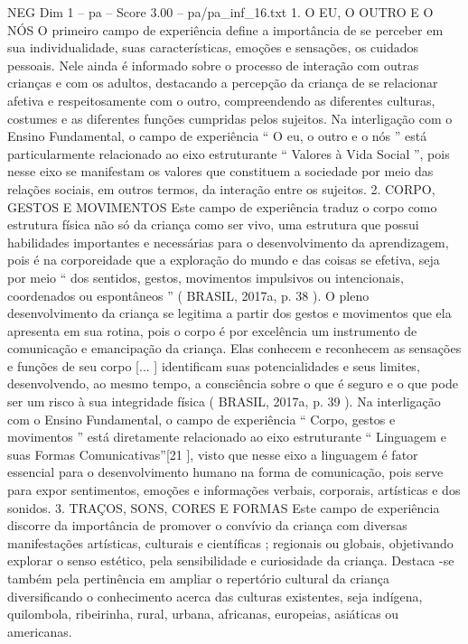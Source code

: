 \begin{textsample}{NEG Dim 1 – pa – Score 3.00 – pa/pa\_inf\_16.txt}  \label{ex:f1_neg_251}
1.
O EU, O OUTRO E O NÓS O primeiro campo de experiência define a importância de se perceber em sua individualidade, suas características, emoções e sensações, os cuidados pessoais.
Nele ainda é informado sobre o processo de interação com outras crianças e com os adultos, destacando a percepção da criança de se relacionar afetiva e respeitosamente com o outro, compreendendo as diferentes culturas, costumes e as diferentes funções cumpridas pelos sujeitos.
Na interligação com o Ensino Fundamental, o campo de experiência “ O eu, o outro e o nós ” está particularmente relacionado ao eixo estruturante “ Valores à Vida Social ”, pois nesse eixo se manifestam os valores que constituem a sociedade por meio das relações sociais, em outros termos, da interação entre os sujeitos. 2.
CORPO, GESTOS E MOVIMENTOS Este campo de experiência traduz o corpo como estrutura física não só da criança como ser vivo, uma estrutura que possui habilidades importantes e necessárias para o desenvolvimento da aprendizagem, pois é na corporeidade que a exploração do mundo e das coisas se efetiva, seja por meio “ dos sentidos, gestos, movimentos impulsivos ou intencionais, coordenados ou espontâneos ” ( BRASIL, 2017a, p. 38 ).
O pleno desenvolvimento da criança se legitima a partir dos gestos e movimentos que ela apresenta em sua rotina, pois o corpo é por excelência um instrumento de comunicação e emancipação da criança.
Elas conhecem e reconhecem as sensações e funções de seu corpo [... ] identificam suas potencialidades e seus limites, desenvolvendo, ao mesmo tempo, a consciência sobre o que é seguro e o que pode ser um risco à sua integridade física ( BRASIL, 2017a, p. 39 ).
Na interligação com o Ensino Fundamental, o campo de experiência “ Corpo, gestos e movimentos ” está diretamente relacionado ao eixo estruturante “ Linguagem e suas Formas Comunicativas”[21 ], visto que nesse eixo a linguagem é fator essencial para o desenvolvimento humano na forma de comunicação, pois serve para expor sentimentos, emoções e informações verbais, corporais, artísticas e dos sonidos. 3.
TRAÇOS, SONS, CORES E FORMAS Este campo de experiência discorre da importância de promover o convívio da criança com diversas manifestações artísticas, culturais e científicas ; regionais ou globais, objetivando explorar o senso estético, pela sensibilidade e curiosidade da criança.
Destaca -se também pela pertinência em ampliar o repertório cultural da criança diversificando o conhecimento acerca das culturas existentes, seja indígena, quilombola, ribeirinha, rural, urbana, africanas, europeias, asiáticas ou americanas.

\end{textsample}
